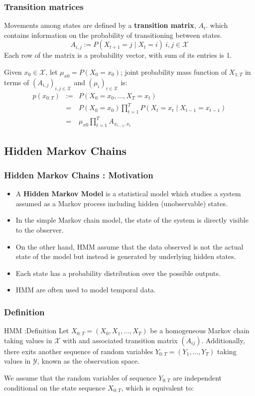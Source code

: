 \documentclass[xcolor=dvipsnames, compress]{beamer}
\begin{document}
\begin{frame}
\frametitle{Transition matrices}
Movements among states are defined by a \textbf{transition matrix}, $A_{t}$. which contains information on the probability of transitioning between states. 
\begin{equation*}
A_{i,j}:={P}\left(X_{t+1}=j\mid X_{t}=i\right)\:i,j\in\mathcal{X}
\end{equation*}		
Each row of the matrix is a probability vector, with sum of its entries is 1. 

Given $x_{0}\in\mathcal{X}$, let $\mu_{x0}={P}\left(X_{0}=x_{0}\right)$; joint probability mass function of $X_{1:T}$ in terms of $\left(A_{i,j}\right)_{i,j\in\mathcal{X}}$ and $\left(\mu_{i}\right)_{i\in\mathcal{X}}$ is:
\begin{eqnarray*}
p\left(x_{0:T}\right) & := & {P}\left(X_{0}=x_{0},\ldots,X_{T}=x_{t}\right)\\
& =& {P}\left(X_{0}=x_{0}\right)\prod_{t=1}^{T}{P}\left(X_{t}=x_{t}\mid X_{t-1}=x_{t-1}\right)\\
& = & \mu_{x0}\prod_{t=1}^{T}A_{x_{t-1},x_{t}}
\end{eqnarray*}		
\end{frame}
%
\begin{frame}
\section{Hidden Markov Chains }
\frametitle{Hidden Markov Chains : Motivation}
\begin{itemize}
\item A  \textbf{Hidden Markov Model} is a statistical model which studies a system assumed as a Markov process including hidden (unobservable) states. 
\item In the simple Markov chain model, the state of the system is directly visible to the observer. 
\item On the other hand, HMM assume that the data observed is not the actual state of the model but instead is generated by underlying hidden states.
\item Each state has a probability distribution over the possible outputs. 
\item HMM are often used to model temporal data.
\end{itemize}
\end{frame}
%
\begin{frame}
\frametitle{Definition}
\begin{block}{HMM :Definition}
Let $X_{0:T}=\left(X_{0},X_{1},\ldots,X_{T}\right)$ be a homogeneous Markov chain taking values in $\mathcal{X}$ with and associated transition matrix $\left(A_{ij}\right)$. Additionally, there exits another sequence of random variables $Y_{0:T}=\left(Y_{1},\ldots,Y_{T}\right)$ taking values in $\mathcal{Y}$, known as the observation space. 
\end{block}	

We assume that the random variables of sequence $Y_{0:T}$ are independent conditional on the state sequence $X_{0:T}$, which is equivalent to:
\end{frame}
\end{document}
